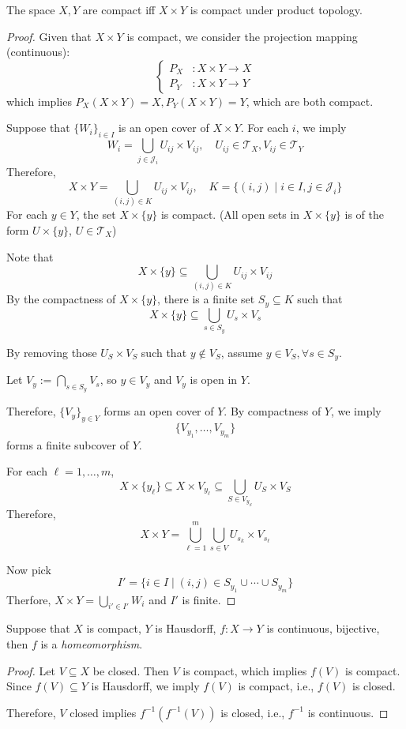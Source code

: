\begin{theorem}
The space $X,Y$ are compact iff $X\times Y$ is compact under product topology.
\end{theorem}
\begin{proof}
Given that $X\times Y$ is compact, we consider the projection mapping (continuous):
\[
\left\{
\begin{aligned}
P_X&:X\times Y\to X\\
P_Y&:X\times Y\to Y
\end{aligned}
\right.
\]
which implies $P_X(X\times Y)=X,P_Y(X\times Y)=Y$, which are both compact.

Suppose that $\{W_i\}_{i\in I}$ is an open cover of $X\times Y$. For each $i$, we imply
\[
W_i = \bigcup_{j\in\mathcal{J}_i}U_{ij}\times V_{ij},\quad
U_{ij}\in\mathcal{T}_X,V_{ij}\in\mathcal{T}_Y
\]
Therefore,
\[
X\times Y = \bigcup_{(i,j)\in K}U_{ij}\times V_{ij},\quad
K=\{(i,j)\mid i\in I, j\in\mathcal{J}_i\}
\]
For each $y\in Y$, the set $X\times\{y\}$ is compact. (All open sets in $X\times \{y\}$ is of the form $U\times\{y\}$, $U\in\mathcal{T}_X$)

Note that 
\[
X\times\{y\}\subseteq\bigcup_{(i,j)\in K}U_{ij}\times V_{ij}
\]
By the compactness of $X\times\{y\}$, there is a finite set $S_y\subseteq K$ such that
\[
X\times\{y\}\subseteq\bigcup_{s\in S_y}U_s\times V_s
\]

By removing those $U_S\times V_S$ such that $y\notin V_S$, assume $y\in V_S,\forall s\in S_y$.

Let $V_y := \bigcap_{s\in S_y}V_s$, so $y\in V_y$ and $V_y$ is open in $Y$. 

Therefore, $\{V_y\}_{y\in Y}$ forms an open cover of $Y$. By compactness of $Y$, we imply
\[
\{V_{y_1},\dots,V_{y_m}\}
\]
forms a finite subcover of $Y$.

For each $\ell=1,\dots,m$,
\[
X\times \{y_\ell\}\subseteq X\times V_{y_\ell}
\subseteq
\bigcup_{S\in V_{y_S}}U_S\times V_S
\]
Therefore,
\[
X\times Y = \bigcup_{\ell=1}^m\bigcup_{s\in V}U_{s_k}\times V_{s_\ell}
\]

Now pick
\[
I'=\{i\in I\mid (i,j)\in S_{y_1}\cup\cdots\cup S_{y_m}\}
\]
Therfore, $X\times Y = \bigcup_{i'\in I'}W_i$ and $I'$ is finite.
\end{proof}
\begin{theorem}
Suppose that $X$ is compact, $Y$ is Hausdorff, $f:X\to Y$ is continuous, bijective, then $f$ is a \emph{homeomorphism}.
\end{theorem}
\begin{proof}
Let $V\subseteq X$ be closed. Then $V$ is compact, which implies $f(V)$ is compact. 
Since $f(V)\subseteq Y$ is Hausdorff, we imply $f(V)$ is compact, i.e., $f(V)$ is closed.

Therefore, $V$ closed implies $f^{-1}(f^{-1}(V))$ is closed, i.e., $f^{-1}$ is continuous.
\end{proof}


















